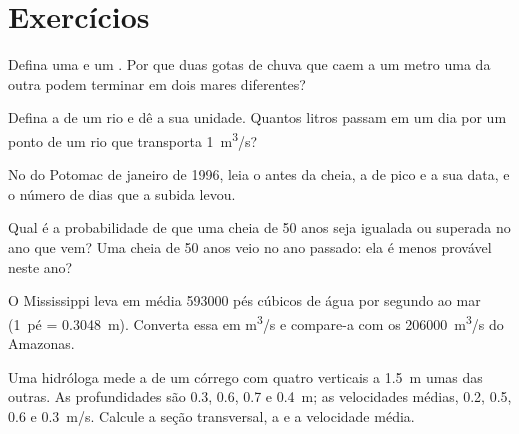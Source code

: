 \section{Exercícios}

\begin{exercise}[$\star$]\label{exo:g10:drainage-basins:1}
Defina uma  e um . Por que duas gotas de
chuva que caem a um metro uma da outra podem terminar em dois mares
diferentes?
\end{exercise}

\begin{exercise}[$\star$]\label{exo:g10:drainage-basins:2}
Defina a  de um rio e dê a sua unidade. Quantos litros passam em um dia
por um ponto de um rio que transporta \qty{1}{m^3/s}?
\end{exercise}

\begin{exercise}[$\star$]\label{exo:g10:drainage-basins:3}
No  do Potomac de janeiro de 1996, leia o  antes
da cheia, a  de pico e a sua data, e o número de dias que a subida
levou.
\end{exercise}

\begin{exercise}[$\star$]\label{exo:g10:drainage-basins:4}
Qual é a probabilidade de que uma cheia de \num{50} anos seja igualada ou
superada no ano que vem? Uma cheia de \num{50} anos veio no ano passado: ela
é menos provável neste ano?
\end{exercise}

\begin{exercise}[$\star$]\label{exo:g10:drainage-basins:5}
O Mississippi leva em média \num{593000} pés cúbicos de água por segundo ao
mar (\num{1}~pé = \qty{0.3048}{m}). Converta essa  em \unit{m^3/s} e
compare-a com os \qty{206000}{m^3/s} do Amazonas.
\end{exercise}

\begin{exercise}[$\star\star$]\label{exo:g10:drainage-basins:6}
Uma hidróloga mede a  de um córrego com quatro verticais a
\qty{1.5}{m} umas das outras. As profundidades são \num{0.3}, \num{0.6},
\num{0.7} e \qty{0.4}{m}; as velocidades médias, \num{0.2}, \num{0.5},
\num{0.6} e \qty{0.3}{m/s}. Calcule a seção transversal, a  e a
velocidade média.
\end{exercise}

